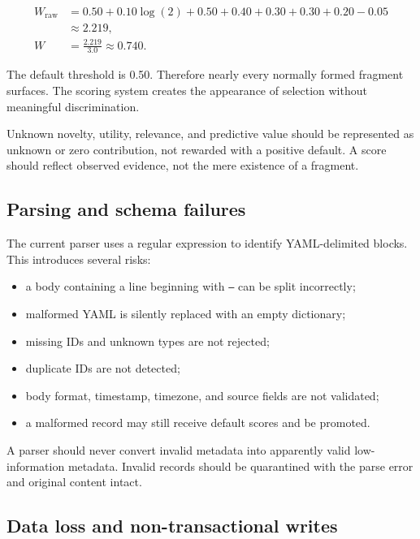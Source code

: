 \documentclass[11pt,a4paper]{article}
\begin{document}
\begin{align}
W_{\mathrm{raw}} &= 0.50 + 0.10\log(2) + 0.50 + 0.40 + 0.30 + 0.30 + 0.20 - 0.05 \\
&\approx 2.219, \\
W &= \frac{2.219}{3.0} \approx 0.740.
\end{align}

The default threshold is 0.50. Therefore nearly every normally formed fragment surfaces. The scoring system creates the appearance of selection without meaningful discrimination.

\begin{warningbox}
Unknown novelty, utility, relevance, and predictive value should be represented as unknown or zero contribution, not rewarded with a positive default. A score should reflect observed evidence, not the mere existence of a fragment.
\end{warningbox}

\subsection{Parsing and schema failures}

The current parser uses a regular expression to identify YAML-delimited blocks. This introduces several risks:

\begin{itemize}
  \item a body containing a line beginning with \texttt{---} can be split incorrectly;
  \item malformed YAML is silently replaced with an empty dictionary;
  \item missing IDs and unknown types are not rejected;
  \item duplicate IDs are not detected;
  \item body format, timestamp, timezone, and source fields are not validated;
  \item a malformed record may still receive default scores and be promoted.
\end{itemize}

A parser should never convert invalid metadata into apparently valid low-information metadata. Invalid records should be quarantined with the parse error and original content intact.

\subsection{Data loss and non-transactional writes}
\end{document}
